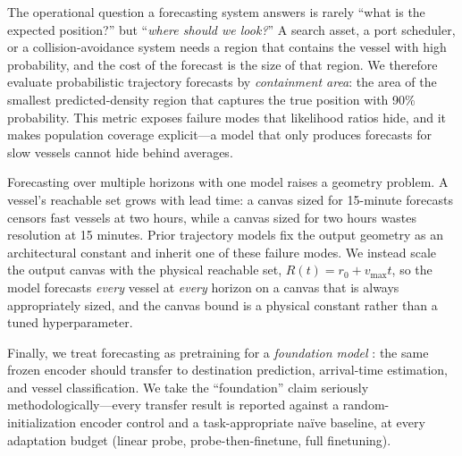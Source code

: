 \documentclass{article}
\begin{document}
The operational question a forecasting system answers is rarely ``what is
the expected position?'' but ``\emph{where should we look?}'' A search
asset, a port scheduler, or a collision-avoidance system needs a region
that contains the vessel with high probability, and the cost of the
forecast is the size of that region. We therefore evaluate probabilistic
trajectory forecasts by \emph{containment area}: the area of the smallest
predicted-density region that captures the true position with 90\%
probability. This metric exposes failure modes that likelihood ratios hide,
and it makes population coverage explicit---a model that only produces
forecasts for slow vessels cannot hide behind averages.

Forecasting over multiple horizons with one model raises a geometry
problem. A vessel's reachable set grows with lead time: a canvas sized for
15-minute forecasts censors fast vessels at two hours, while a canvas sized
for two hours wastes resolution at 15 minutes. Prior trajectory models fix
the output geometry as an architectural constant and inherit one of these
failure modes. We instead scale the output canvas with the physical
reachable set, $R(t) = r_0 + v_{\max} t$, so the model forecasts
\emph{every} vessel at \emph{every} horizon on a canvas that is always
appropriately sized, and the canvas bound is a physical constant rather
than a tuned hyperparameter.

Finally, we treat forecasting as pretraining for a \emph{foundation model}
\citep{devlin2019bert, brown2020gpt3, radford2021clip}: the same frozen
encoder should transfer to destination prediction, arrival-time estimation,
and vessel classification. We take the ``foundation'' claim seriously
methodologically---every transfer result is reported against a
random-initialization encoder control and a task-appropriate na\"ive
baseline, at every adaptation budget (linear probe, probe-then-finetune,
full finetuning).
\end{document}
